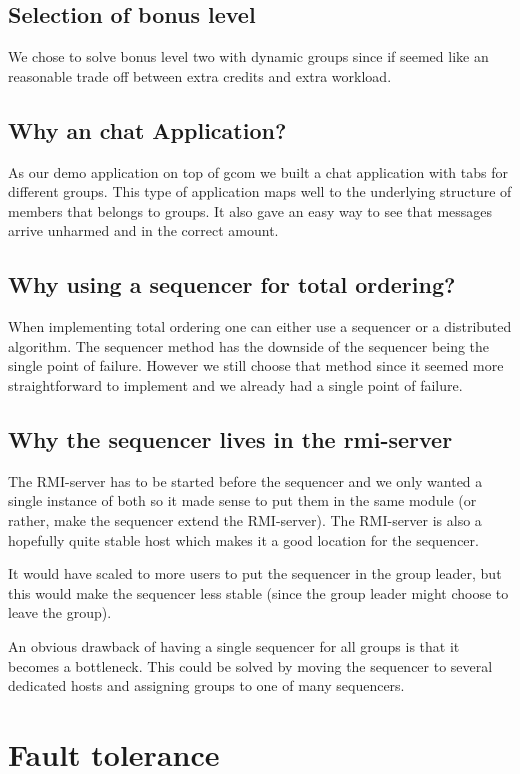 \documentclass[english]{article}
\begin{document}
\subsection{Selection of bonus level}
We chose to solve bonus level two with dynamic groups since if seemed like an reasonable trade off between extra credits and extra workload. 

\subsection{Why an chat Application?}
As our demo application on top of gcom we built a chat application with tabs for different groups. This type of application maps well to the underlying structure of members that belongs to groups. It also gave an easy way to see that messages arrive unharmed and in the correct amount. 

\subsection{Why using a sequencer for total ordering?}
When implementing total ordering one can either use a sequencer or a distributed algorithm. The sequencer method has the downside of the sequencer being the single point of failure. However we still choose that method since it seemed more straightforward to implement and we already had a single point of failure.

\subsection{Why the sequencer lives in the rmi-server}
The RMI-server has to be started before the sequencer and we only wanted a single instance of both so it made sense to put them in the same module (or rather, make the sequencer extend the RMI-server). The RMI-server is also a hopefully quite stable host which makes it a good location for the sequencer.

It would have scaled to more users to put the sequencer in the group leader, but this would make the sequencer less stable (since the group leader might choose to leave the group).

An obvious drawback of having a single sequencer for all groups is that it becomes a bottleneck. This could be solved by moving the sequencer to several dedicated hosts and assigning groups to one of many sequencers.

\section{Fault tolerance}
\end{document}
